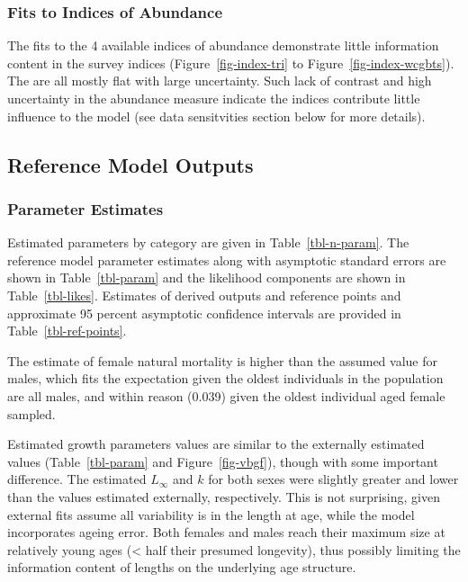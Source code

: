 \documentclass[
]{scrartcl}
\begin{document}
\subsubsection{Fits to Indices of
Abundance}\label{fits-to-indices-of-abundance}

The fits to the 4 available indices of abundance demonstrate little
information content in the survey indices (Figure~\ref{fig-index-tri} to
Figure~\ref{fig-index-wcgbts}). The are all mostly flat with large
uncertainty. Such lack of contrast and high uncertainty in the abundance
measure indicate the indices contribute little influence to the model
(see data sensitvities section below for more details).

\subsection{Reference Model Outputs}\label{reference-model-outputs}

\subsubsection{Parameter Estimates}\label{parameter-estimates}

Estimated parameters by category are given in Table~\ref{tbl-n-param}.
The reference model parameter estimates along with asymptotic standard
errors are shown in Table~\ref{tbl-param} and the likelihood components
are shown in Table~\ref{tbl-likes}. Estimates of derived outputs and
reference points and approximate 95 percent asymptotic confidence
intervals are provided in Table~\ref{tbl-ref-points}.

The estimate of female natural mortality is higher than the assumed
value for males, which fits the expectation given the oldest individuals
in the population are all males, and within reason (0.039) given the
oldest individual aged female sampled.

Estimated growth parameters values are similar to the externally
estimated values (Table~\ref{tbl-param} and Figure~\ref{fig-vbgf}),
though with some important difference. The estimated \(L_{\infty}\) and
\(k\) for both sexes were slightly greater and lower than the values
estimated externally, respectively. This is not surprising, given
external fits assume all variability is in the length at age, while the
model incorporates ageing error. Both females and males reach their
maximum size at relatively young ages (\textless{} half their presumed
longevity), thus possibly limiting the information content of lengths on
the underlying age structure.
\end{document}

